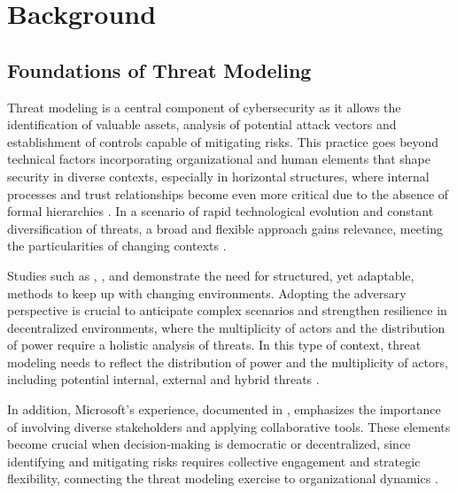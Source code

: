 
%

\chapter{Background}
\label{cha:background}

\glsresetall

\section{Foundations of Threat Modeling}
\label{sec:foundations_threat_modeling}

Threat modeling is a central component of cybersecurity as it allows the
identification of valuable assets, analysis of potential attack vectors and
establishment of controls capable of mitigating risks. This practice goes beyond
technical factors incorporating organizational and human elements that shape
security in diverse contexts, especially in horizontal structures, where
internal processes and trust relationships become even more critical due to the
absence of formal hierarchies \cite{Colbac}. In a scenario of rapid
technological evolution and constant diversification of threats, a broad and
flexible approach gains relevance, meeting the particularities of changing
contexts \cite{ThreatModelingdesigningForSecurity}.

Studies such as \cite{ThreatModelingAsABasisForSecurityRequirements},
\cite{AdvancedThreatModeling}, and \cite{DemystifyingTheThreatModelingProcess}
demonstrate the need for structured, yet adaptable, methods to keep up with
changing environments. Adopting the adversary perspective
\cite{AHybridThreatModelingMethod} is crucial to anticipate complex scenarios
and strengthen resilience in decentralized environments, where the multiplicity
of actors and the distribution of power require a holistic analysis of threats.
In this type of context, threat modeling needs to reflect the distribution of
power and the multiplicity of actors, including potential internal, external and
hybrid threats \cite{ThreatModelingASummaryOfAvailableMethods}.

In addition, Microsoft's experience, documented in
\cite{ExperiencesThreatModelingAtMicrosoft}, emphasizes the importance of
involving diverse stakeholders and applying collaborative tools. These elements
become crucial when decision-making is democratic or decentralized, since
identifying and mitigating risks requires collective engagement and strategic
flexibility, connecting the threat modeling exercise to organizational dynamics
\cite{ParticipatoryThreatModelling}.

